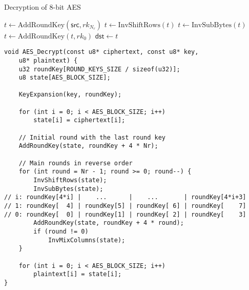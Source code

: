 \newpage
\begin{algorithm}[H]
	\caption{Decryption of 8-bit AES}
	
	\BlankLine
	$t \leftarrow \text{AddRoundKey}(\mathsf{src}, rk_{N_r})$\;
	$t \leftarrow \text{InvShiftRows}(t)$\;
	$t \leftarrow \text{InvSubBytes}(t)$\;
	$t \leftarrow \text{AddRoundKey}(t, rk_{0})$\;
	$\mathsf{dst} \leftarrow t$\;
	\;
\end{algorithm}
\vspace{18pt}
\begin{lstlisting}[style=C, caption={8-bit AES Decryption},captionpos=t]
void AES_Decrypt(const u8* ciphertext, const u8* key,
	u8* plaintext) {
	u32 roundKey[ROUND_KEYS_SIZE / sizeof(u32)];
	u8 state[AES_BLOCK_SIZE];
	
	KeyExpansion(key, roundKey);
	
	for (int i = 0; i < AES_BLOCK_SIZE; i++)
		state[i] = ciphertext[i];
	
	// Initial round with the last round key
	AddRoundKey(state, roundKey + 4 * Nr);
	
	// Main rounds in reverse order
	for (int round = Nr - 1; round >= 0; round--) {
		InvShiftRows(state);
		InvSubBytes(state);
// i: roundKey[4*i] |    ...      |    ...       | roundKey[4*i+3]
// 1: roundKey[  4] | roundKey[5] | roundKey[ 6] | roundKey[    7]
// 0: roundKey[  0] | roundKey[1] | roundKey[ 2] | roundKey[    3]
		AddRoundKey(state, roundKey + 4 * round);
		if (round != 0)
			InvMixColumns(state);
	}
	
	for (int i = 0; i < AES_BLOCK_SIZE; i++)
		plaintext[i] = state[i];
}
\end{lstlisting}

\newpage